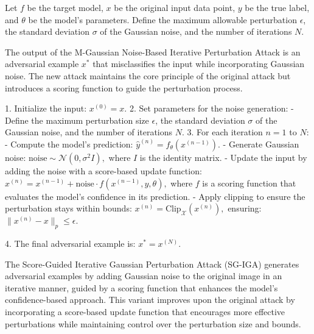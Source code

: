 Let \( f \) be the target model, \( x \) be the original input data point, \( y \) be the true label, and \( \theta \) be the model's parameters.  
Define the maximum allowable perturbation \( \epsilon \), the standard deviation \( \sigma \) of the Gaussian noise, and the number of iterations \( N \).  
 

The output of the M-Gaussian Noise-Based Iterative Perturbation Attack is an adversarial example $x^*$ that misclassifies the input while incorporating Gaussian noise. The new attack maintains the core principle of the original attack but introduces a scoring function to guide the perturbation process.


1. Initialize the input:
   $
   x^{(0)} = x.
   $
2. Set parameters for the noise generation:
   - Define the maximum perturbation size $\epsilon$, the standard deviation $\sigma$ of the Gaussian noise, and the number of iterations $N$.
3. For each iteration $n = 1$ to $N$:
   - Compute the model's prediction:
   $
   \hat{y}^{(n)} = f_{\theta}(x^{(n-1)}).
   $
   - Generate Gaussian noise:
   $
   \text{noise} \sim \mathcal{N}(0, \sigma^2 I),
   $
   where $I$ is the identity matrix.
   - Update the input by adding the noise with a score-based update function:
   $
   x^{(n)} = x^{(n-1)} + \text{noise} \cdot f(x^{(n-1)}, y, \theta),
   $
   where $f$ is a scoring function that evaluates the model's confidence in its prediction.
   - Apply clipping to ensure the perturbation stays within bounds:
   $
   x^{(n)} = \text{Clip}_{\mathcal{X}}(x^{(n)}),
   $
   ensuring:
   $
   \|x^{(n)} - x\|_p \leq \epsilon.
   $

4. The final adversarial example is:
   $
   x^* = x^{(N)}.
   $

The Score-Guided Iterative Gaussian Perturbation Attack (SG-IGA) generates adversarial examples by adding Gaussian noise to the original image in an iterative manner, guided by a scoring function that enhances the model's confidence-based approach. This variant improves upon the original attack by incorporating a score-based update function that encourages more effective perturbations while maintaining control over the perturbation size and bounds.